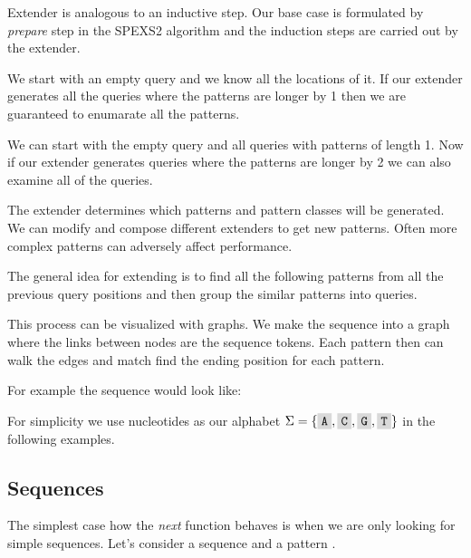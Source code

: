 Extender is analogous to an inductive step. Our base case is formulated by \emph{prepare} step in the SPEXS2 algorithm and the induction steps are carried out by the extender.

\begin{exmp}
We start with an empty query and we know all the locations of it. If our extender generates all the queries where the patterns are longer by 1 then we are guaranteed to enumarate all the patterns.
\end{exmp}

\begin{exmp}
We can start with the empty query and all queries with patterns of length 1. Now if our extender generates queries where the patterns are longer by 2 we can also examine all of the queries.
\end{exmp}

The extender determines which patterns and pattern classes will be generated. We can modify and compose different extenders to get new patterns. Often more complex patterns can adversely affect performance.

The general idea for extending is to find all the following patterns from all the previous query positions and then group the similar patterns into queries.

This process can be visualized with graphs. We make the sequence into a graph where the links between nodes are the sequence tokens. Each pattern then can walk the edges and match find the ending position for each pattern.

For example the sequence  would look like:

\begin{figure}[H]
	
\end{figure}

For simplicity we use nucleotides as our alphabet $\Sigma = \{ \R{A}, \R{C}, \R{G}, \R{T} \}$ in the following examples.

\subsection{Sequences}

The simplest case how the \emph{next} function behaves is when we are only looking for simple sequences. Let's consider a sequence  and a pattern .

\begin{figure}[H]
	
\end{figure}

